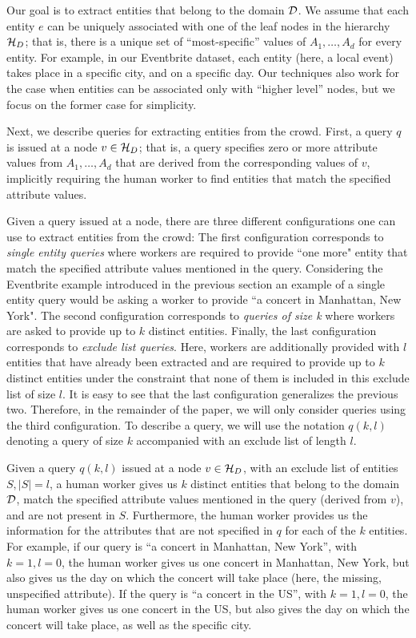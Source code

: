  Our goal is to extract entities that belong to the domain $\mathcal{D}$. We assume that each entity $e$ can be uniquely associated with one of the leaf nodes in the hierarchy $\mathcal{H}_D$; that is, there is a unique set of ``most-specific'' values of $A_1, \ldots, A_d$ for every entity. For example, in our Eventbrite dataset, each entity (here, a local event) takes place in a specific city, and on a specific day. Our techniques also work for the case when entities can be associated only with ``higher level'' nodes, but we focus on the former case for simplicity.

 Next, we describe queries for extracting entities from the crowd. First, a query $q$ is issued at a node $v \in \mathcal{H}_D$; that is, a query specifies zero or more attribute values from $A_1, \ldots, A_d$ that are derived from the corresponding values of $v$, implicitly requiring the human worker to find entities that match the specified attribute values.  

Given a query issued at a node, there are three different configurations one can use to extract entities from the crowd: The first configuration corresponds to {\em single entity queries} where workers are required to provide ``one more" entity that match the specified attribute values mentioned in the query. Considering the Eventbrite example introduced in the previous section an example of a single entity query would be asking a worker to provide ``a concert in Manhattan, New York". The second configuration corresponds to {\em queries of size k} where workers are asked to provide up to $k$ distinct entities. Finally, the last configuration corresponds to {\em exclude list queries}. Here,  workers are additionally provided with $l$ entities that have already been extracted and are required to provide up to $k$ distinct entities under the constraint that none of them is included in this exclude list of size $l$. It is easy to see that the last configuration generalizes the previous two. Therefore, in the remainder of the paper, we will only consider queries using the third configuration. To describe a query, we will use the notation $q(k,l)$ denoting a query of size $k$ accompanied with an exclude list of length $l$. 

 Given a query $q(k, l)$ issued at a node $v \in \mathcal{H}_D$, with an exclude list of entities $S, |S| = l$, a human worker gives us $k$ distinct entities that belong to the domain $\mathcal{D}$, match the specified attribute values mentioned in the query (derived from $v$), and are not present in $S$. Furthermore, the human worker provides us the information for the attributes that are not specified in $q$ for each of the $k$ entities. For example, if our query is ``a concert in Manhattan, New York'', with $k = 1, l = 0$, the human worker gives us one concert in Manhattan, New York, but also gives us the day on which the concert will take place (here, the missing, unspecified attribute). If the query is ``a concert in the US'', with $k = 1, l = 0$, the human worker gives us one concert in the US, but also gives the day on which the concert will take place, as well as the specific city. 

